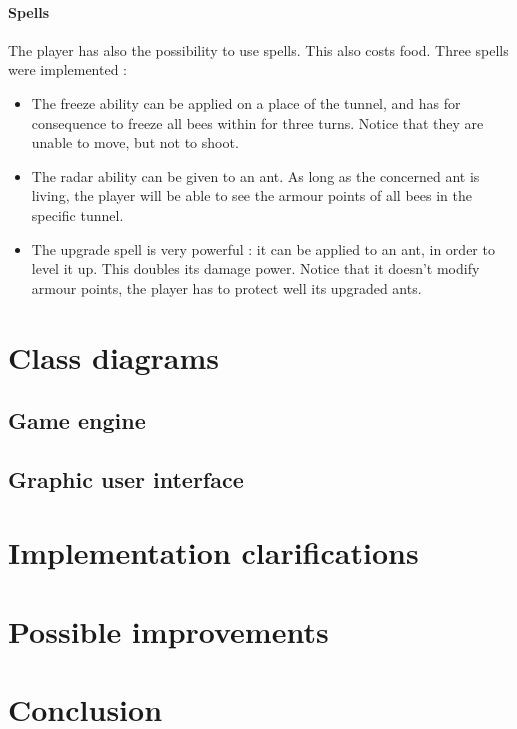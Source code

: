 \documentclass[a4paper]{article}
\begin{document}
\paragraph{Spells} The player has also the possibility to use spells. This also costs food. Three spells were implemented :

\begin{itemize}
	\item The freeze ability can be applied on a place of the tunnel, and has for consequence to freeze all bees within for three turns. Notice that they are unable to move, but not to shoot.
	\item The radar ability can be given to an ant. As long as the concerned ant is living, the player will be able to see the armour points of all bees in the specific tunnel.
	\item The upgrade spell is very powerful : it can be applied to an ant, in order to level it up. This doubles its damage power. Notice that it doesn't modify armour points, the player has to protect well its upgraded ants.
\end{itemize}


\section{Class diagrams}

	\subsection{Game engine}
	\subsection{Graphic user interface}


\section{Implementation clarifications}


\section{Possible improvements}


\section*{Conclusion}
\end{document}
